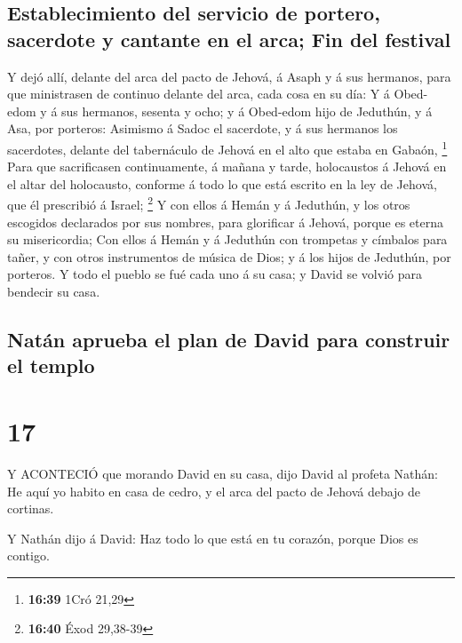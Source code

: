 \hypertarget{establecimiento-del-servicio-de-portero-sacerdote-y-cantante-en-el-arca-fin-del-festival}{%
\subsection{Establecimiento del servicio de portero, sacerdote y
cantante en el arca; Fin del
festival}\label{establecimiento-del-servicio-de-portero-sacerdote-y-cantante-en-el-arca-fin-del-festival}}

 Y dejó allí, delante del arca del pacto de Jehová, á Asaph
y á sus hermanos, para que ministrasen de continuo delante del arca,
cada cosa en su día:  Y á Obed-edom y á sus hermanos,
sesenta y ocho; y á Obed-edom hijo de Jeduthún, y á Asa, por porteros:
 Asimismo á Sadoc el sacerdote, y á sus hermanos los
sacerdotes, delante del tabernáculo de Jehová en el alto que estaba en
Gabaón, \footnote{\textbf{16:39} 1Cró 21,29}  Para que
sacrificasen continuamente, á mañana y tarde, holocaustos á Jehová en el
altar del holocausto, conforme á todo lo que está escrito en la ley de
Jehová, que él prescribió á Israel; \footnote{\textbf{16:40} Éxod
  29,38-39}  Y con ellos á Hemán y á Jeduthún, y los otros
escogidos declarados por sus nombres, para glorificar á Jehová, porque
es eterna su misericordia;  Con ellos á Hemán y á Jeduthún
con trompetas y címbalos para tañer, y con otros instrumentos de música
de Dios; y á los hijos de Jeduthún, por porteros.  Y todo
el pueblo se fué cada uno á su casa; y David se volvió para bendecir su
casa.

\hypertarget{natuxe1n-aprueba-el-plan-de-david-para-construir-el-templo}{%
\subsection{Natán aprueba el plan de David para construir el
templo}\label{natuxe1n-aprueba-el-plan-de-david-para-construir-el-templo}}

\hypertarget{section-16}{%
\section{17}\label{section-16}}

 Y ACONTECIÓ que morando David en su casa, dijo David al
profeta Nathán: He aquí yo habito en casa de cedro, y el arca del pacto
de Jehová debajo de cortinas.

 Y Nathán dijo á David: Haz todo lo que está en tu corazón,
porque Dios es contigo.

